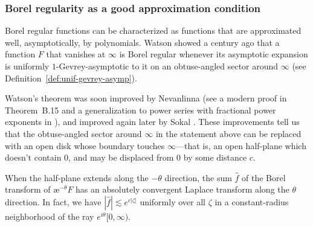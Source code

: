 \documentclass{article}
\theoremstyle{definition}
\newcommand{\aexp}{\text{\ae}}
\begin{document}
\subsubsection{Borel regularity as a good approximation condition}
Borel regular functions can be characterized as functions that are approximated well, asymptotically, by polynomials. Watson showed a century ago \cite{watson} that a function $F$ that vanishes at $\infty$ is Borel regular whenever its asymptotic expansion is uniformly $1$-Gevrey-asymptotic to it on an obtuse-angled sector around $\infty$ (see Definition~\ref{def:unif-gevrey-asymp}).

Watson's theorem was soon improved by Nevanlinna \cite{nevanlinna} (see a modern proof in \cite{nikolaev2023exact} Theorem~B.15 and a generalization to power series with fractional power exponents in \cite{delabaere--rosoamanana}), and improved again later by Sokal \cite{sokal1980improvement}. These improvements tell us that the obtuse-angled sector around $\infty$ in the statement above can be replaced with an open disk whose boundary touches $\infty$---that is, an open half-plane which doesn't contain $0$, and may be displaced from $0$ by some distance $c$.
\begin{center}
\end{center}
When the half-plane extends along the $-\theta$ direction, the sum $\hat{f}$ of the Borel transform of $\aexp^{-\theta} F$ has an absolutely convergent Laplace transform along the $\theta$ direction. In fact, we have $|\hat{f}| \lesssim e^{c |\zeta|}$ uniformly over all $\zeta$ in a constant-radius neighborhood of the ray $e^{i\theta}[0, \infty)$.
\end{document}
